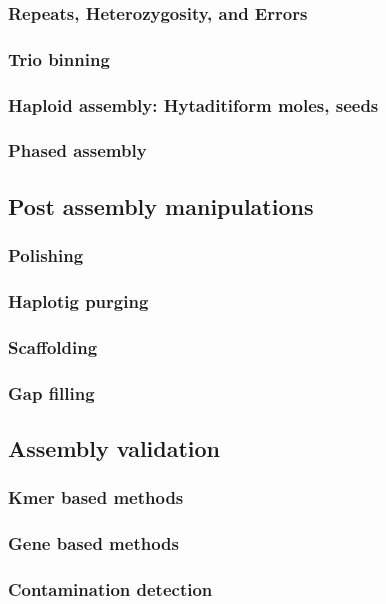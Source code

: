 \par{

}


\subsubsection{Repeats, Heterozygosity, and Errors}
\subsubsection{Trio binning}
\subsubsection{Haploid assembly: Hytaditiform moles, seeds}
\subsubsection{Phased assembly}


\subsection{Post assembly manipulations}
\subsubsection{Polishing}
\subsubsection{Haplotig purging}
\subsubsection{Scaffolding}
\subsubsection{Gap filling}

\par{
\cite{pbjelly}\cite{ultralong1}\cite{ultralong2}
}

\subsection{Assembly validation}
\subsubsection{Kmer based methods}
\subsubsection{Gene based methods}
\subsubsection{Contamination detection}

